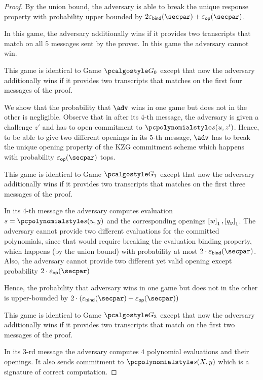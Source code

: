 \begin{proof}
  By the union bound, the adversary is able to break the unique response property with probability upper bounded by $2 \epsbinding (\secpar) + \epsop (\secpar)$.
\iffalse

   In this game, the adversary additionally wins if it provides two transcripts that match on all $5$ messages sent by the prover.
  In this game the adversary cannot win.

   This game is identical to Game $\game{0}$ except that now the
  adversary additionally wins if it provides two transcripts that matches on the first four
  messages of the proof.

   We show that the probability that $\adv$
  wins in one game but does not in the other is negligible.  Observe that in
  after its $4$-th message, the adversary is given a challenge $z'$ and has to open
  commitment to $\p{s} (u, z')$. Hence, to be able to give two different
  openings in its $5$-th message, $\adv$ has to break the unique opening property of the
  KZG commitment scheme which happens with probability $\epsop (\secpar)$ tops.

   This game is identical to Game $\game{1}$ except that now the
  adversary additionally wins if it provides two transcripts that matches on the
  first three messages of the proof.

   In its $4$-th message the adversary computes evaluation
  $s = \p{s} (u, y)$ and the corresponding openings $\left[w\right]_{1}, \left[q_y\right]_{1}$. The adversary
  cannot provide two different evaluations for the committed polynomials, since that would
  require breaking the evaluation binding property, which happens (by the union bound)
  with probability at most $2 \cdot \epsbind (\secpar)$. Also, the adversary cannot provide two
  different yet valid opening except probability $2 \cdot \epsop (\secpar)$

  Hence, the probability that adversary wins in one game but does not in the
  other is upper-bounded by $2 \cdot (\epsbind (\secpar) + \epsop (\secpar))$

   This game is identical to Game $\game{3}$ except that now the
  adversary additionally wins if it provides two transcripts that match on the
  first two messages of the proof.

   In its $3$-rd message the adversary computes $4$ polynomial
  evaluations and their openings. It also sends commitment to $\p{s} (X, y)$ which is a
  signature of correct computation.


\end{proof}
